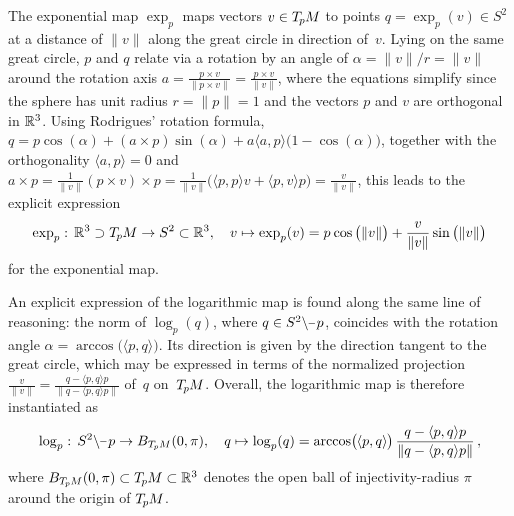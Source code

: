 The exponential map $\exp_p$ maps vectors $v\in T_{\mkern-1.5mu p}\mkern-.5muM$ to points $q = \exp_p(v) \in S^2$ at a distance of $\lVert v\rVert$ along the great circle in direction of~$v$.
Lying on the same great circle, $p$ and $q$ relate via a rotation by an angle of $\alpha = \lVert v\rVert / r = \lVert v\rVert$ around the rotation axis $a = \frac{p\times v}{\lVert p \times v\rVert} = \frac{p\times v}{\lVert v\rVert}$,
where the equations simplify since the sphere has unit radius $r = \lVert p\rVert = 1$ and the vectors $p$ and $v$ are orthogonal in $\mathbb{R}^3$.
Using Rodrigues' rotation formula, $q = p \cos(\alpha) + (a\times p) \sin(\alpha) + a\langle a,p\rangle \big(1- \cos(\alpha) \big)$,
together with the orthogonality $\langle a,p\rangle = 0$ and
$a\times p
 = \frac{1}{\lVert v\rVert} (p\times v) \times p
 = \frac{1}{\lVert v\rVert} \big( \langle p,p\rangle v + \langle p,v\rangle p \big)
 = \frac{v}{\lVert v\rVert}$,
this leads to the explicit expression
\begin{align}\label{eq:sphere_expmap_explicit}
    \exp_p:\, \mathbb{R}^3 \supset T_{\mkern-1.5mu p}\mkern-.5muM \to S^2 \subset \mathbb{R}^3, \quad v \mapsto \exp_p(v) = p\mkern1mu \cos \big(\lVert v\rVert\big) + \frac{v}{\lVert v\rVert} \sin \big(\lVert v\rVert\big)
\end{align}
for the exponential map.

An explicit expression of the logarithmic map is found along the same line of reasoning:
the norm of $\log_p(q)$, where $q\in {S^2 \backslash \mkern-1mu\minus\mkern1mu p}$, coincides with the rotation angle $\alpha = \arccos\!\big( \langle p,q\rangle \big)$.
Its direction is given by the direction tangent to the great circle, which may be expressed in terms of the normalized projection
$\frac{v}{\lVert v\rVert} = \frac{q - \langle p,q\rangle p}{\lVert q - \langle p,q\rangle p\rVert}$
of~$q$ on~$T_{\mkern-1.5mu p}\mkern-.5muM$.
Overall, the logarithmic map is therefore instantiated as
\begin{align}\label{eq:sphere_logmap_explicit}
    \log_p:\, S^2\backslash \mkern-1mu\minus\mkern1mu p \to B_{\TpM}(0,\pi), \quad
    q \mapsto \log_p(q) = \arccos\!\big( \mkern-1mu\langle p,q\rangle \mkern-1mu\big) \, \frac{q - \langle p,q\rangle p}{\lVert q - \langle p,q\rangle p\rVert} \,,
\end{align}
where $B_{T_{\mkern-1.5mu p}\mkern-.5muM}(0,\pi) \subset T_{\mkern-1.5mu p}\mkern-.5muM \subset \mathbb{R}^3$ denotes the open ball of injectivity-radius $\pi$ around the origin of $T_{\mkern-1.5mu p}\mkern-.5muM$.


